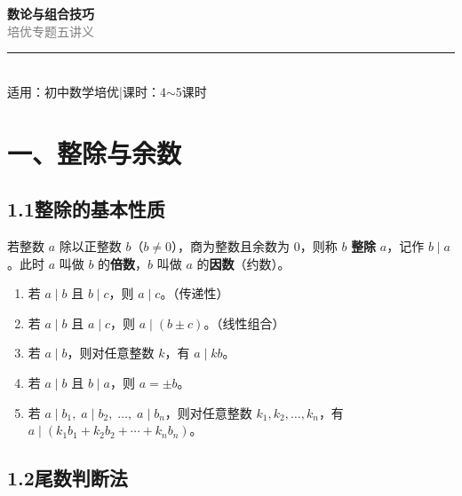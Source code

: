 \documentclass[12pt, a4paper]{ctexart}
\begin{document}
\begin{center}
{\Huge\bfseries\textcolor{mainblue}{数论与组合技巧}}\\[12pt]
{\Large\textcolor{gray}{培优专题五\quad 讲\quad 义}}\\[8pt]
\rule{0.6\textwidth}{1pt}\\[8pt]
{\normalsize 适用：初中数学培优\quad |\quad 课时：4$\sim$5课时}
\end{center}
\vspace{10pt}

\section*{\textcolor{mainblue}{一、整除与余数}}

\subsection*{1.1\quad 整除的基本性质}

\begin{knowledgebox}[整除的定义]
若整数 $a$ 除以正整数 $b$（$b\neq 0$），商为整数且余数为 $0$，则称 $b$ \textbf{整除} $a$，记作 $b\mid a$。此时 $a$ 叫做 $b$ 的\textbf{倍数}，$b$ 叫做 $a$ 的\textbf{因数}（约数）。
\end{knowledgebox}

\vspace{4pt}
\begin{knowledgebox}[整除的基本性质]
\begin{enumerate}[label=\textbf{(\arabic*)}, itemsep=2pt]
  \item 若 $a\mid b$ 且 $b\mid c$，则 $a\mid c$。（传递性）
  \item 若 $a\mid b$ 且 $a\mid c$，则 $a\mid (b\pm c)$。（线性组合）
  \item 若 $a\mid b$，则对任意整数 $k$，有 $a\mid kb$。
  \item 若 $a\mid b$ 且 $b\mid a$，则 $a=\pm b$。
  \item 若 $a\mid b_1,\;a\mid b_2,\;\ldots,\;a\mid b_n$，则对任意整数 $k_1,k_2,\ldots,k_n$，有 $a\mid(k_1 b_1+k_2 b_2+\cdots+k_n b_n)$。
\end{enumerate}
\end{knowledgebox}

\subsection*{1.2\quad 尾数判断法}
\end{document}
